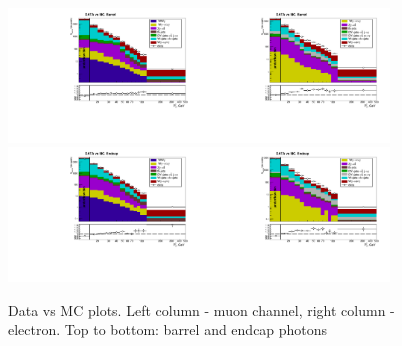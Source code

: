 \begin{figure}[htb]
  \begin{center}
   \includegraphics[width=0.45\textwidth]{../figs/figs_v11/MUON_WGamma/PrepareYields/c_TotalDATAvsMC_Barrel__phoEt.pdf}\includegraphics[width=0.45\textwidth]{../figs/figs_v11/ELECTRON_WGamma/PrepareYields/c_TotalDATAvsMC_Barrel__phoEt.pdf}
   \includegraphics[width=0.45\textwidth]{../figs/figs_v11/MUON_WGamma/PrepareYields/c_TotalDATAvsMC_Endcap__phoEt.pdf}\includegraphics[width=0.45\textwidth]{../figs/figs_v11/ELECTRON_WGamma/PrepareYields/c_TotalDATAvsMC_Endcap__phoEt.pdf}
  \caption{Data vs MC plots. Left column - muon channel, right column - electron. Top to bottom: barrel and endcap photons}
  \label{fig:DATAvsMC}
  \end{center}
\end{figure}



